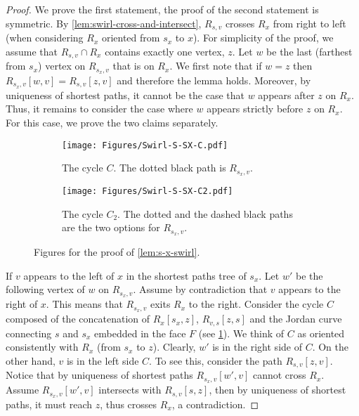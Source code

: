 \documentclass{article}
\begin{document}
\begin{proof}
We prove the first statement, the proof of the second statement is symmetric.
By \cref{lem:swirl-cross-and-intersect}, $R_{s,v}$ crosses $R_x$ from right to left (when considering $R_x$ oriented from $s_x$ to $x$).
For simplicity of the proof, we assume that $R_{s,v}\cap R_x$ contains exactly one vertex, $z$.
Let $w$ be the last (farthest from $s_x$) vertex on $R_{s_x,v}$ that is on $R_x$.
We first note that if $w=z$ then $R_{s_x,v}[w,v]=R_{s,v}[z,v]$ and therefore the lemma holds.
Moreover, by uniqueness of shortest paths, it cannot be the case that $w$ appears after $z$ on $R_x$.
Thus, it remains to consider the case where $w$ appears strictly before $z$ on $R_x$.
For this case, we prove the two claims separately.

\begin{figure}[ht]
    \centering
    \begin{subfigure}[t]{0.3\textwidth}
        \centering
        \texttt{[image: Figures/Swirl-S-SX-C.pdf]}
        \caption{The cycle $C$. The dotted black path is $R_{s_x,v}$.}
        \label{fig:Swirl-S-SX-CA}
    \end{subfigure}
    \hspace{1in}
    \begin{subfigure}[t]{0.3\textwidth}
        \centering
        \texttt{[image: Figures/Swirl-S-SX-C2.pdf]}
        \caption{The cycle $C_2$. The dotted and the dashed black paths are the two options for $R_{s_x,v}$.}
        \label{fig:Swirl-S-SX-C2A}
    \end{subfigure}
    \caption{Figures for the proof of  \cref{lem:s-x-swirl}.  }
    \label{fig:s-x-swirl}
\end{figure}

If $v$ appears to the left of $x$ in the shortest paths tree of $s_x$.
Let $w'$ be the following vertex of $w$ on $R_{s_x,v}$.
Assume by contradiction that $v$ appears to the right of $x$.
This means that $R_{s_x,v}$ exits $R_x$ to the right.
Consider the cycle $C$ composed of the concatenation of $R_x[s_x,z]$, $R_{v,s}[z,s]$ and the Jordan curve connecting $s$ and $s_x$ embedded in the face $F$ (see \cref{fig:Swirl-S-SX-CA}).
We think of $C$ as oriented consistently with $R_x$ (from $s_x$ to $z$).
Clearly, $w'$ is in the right side of $C$.
On the other hand, $v$ is in the left side $C$.
To see this, consider the path $R_{s,v}[z,v]$.
Notice that by uniqueness of shortest paths $R_{s_x,v}[w',v]$ cannot cross $R_x$.
Assume $R_{s_x,v}[w',v]$ intersects with $R_{s,v}[s,z]$, then by uniqueness of shortest paths, it must reach $z$, thus crosses $R_x$, a contradiction.


\end{proof}
\end{document}

